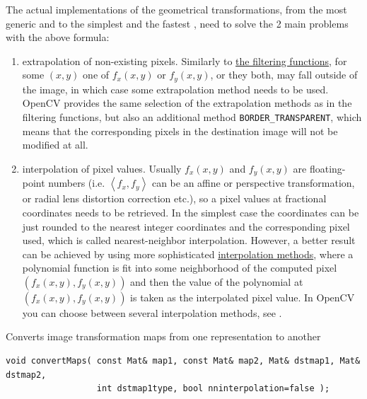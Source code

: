 The actual implementations of the geometrical transformations, from the most generic  and to the simplest and the fastest , need to solve the 2 main problems with the above formula:
\begin{enumerate}
    \item extrapolation of non-existing pixels. Similarly to \hyperref[CV.Filtering]{the filtering functions}, for some $(x,y)$ one of $f_x(x,y)$ or $f_y(x,y)$, or they both, may fall outside of the image, in which case some extrapolation method needs to be used. OpenCV provides the same selection of the extrapolation methods as in the filtering functions, but also an additional method \texttt{BORDER\_TRANSPARENT}, which means that the corresponding pixels in the destination image will not be modified at all.
    \item interpolation of pixel values. Usually $f_x(x,y)$ and $f_y(x,y)$ are floating-point numbers (i.e. $\left<f_x, f_y\right>$ can be an affine or perspective transformation, or radial lens distortion correction etc.), so a pixel values at fractional coordinates needs to be retrieved. In the simplest case the coordinates can be just rounded to the nearest integer coordinates and the corresponding pixel used, which is called nearest-neighbor interpolation. However, a better result can be achieved by using more sophisticated \href{http://en.wikipedia.org/wiki/Multivariate_interpolation}{interpolation methods}, where a polynomial function is fit into some neighborhood of the computed pixel $(f_x(x,y), f_y(x,y))$ and then the value of the polynomial at $(f_x(x,y), f_y(x,y))$ is taken as the interpolated pixel value. In OpenCV you can choose between several interpolation methods, see . 
\end{enumerate}

\label{convertMaps}
Converts image transformation maps from one representation to another

\begin{lstlisting}
void convertMaps( const Mat& map1, const Mat& map2, Mat& dstmap1, Mat& dstmap2,
                  int dstmap1type, bool nninterpolation=false );
\end{lstlisting}
\begin{description}
\end{description}

